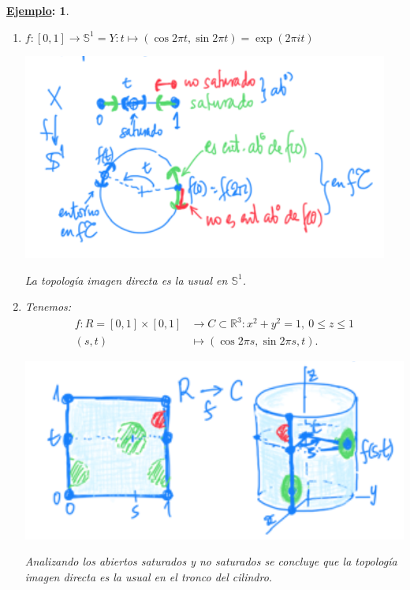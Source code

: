 \documentclass[10pt,a4paper,openright]{book}
\theoremstyle{break}
\newtheorem*{ej}{\underline{Ejemplo}:}
\begin{document}
\begin{ej}
\begin{enumerate}
    \item $f: \left[ 0, 1 \right] \rightarrow \mathbb{S}^1 = Y: t \mapsto \left( \cos 2\pi t, \sin 2\pi t \right) = \exp\left( 2 \pi i t \right)$
    \begin{center}
        \includegraphics[scale=0.4]{images/ej_sat_1} 

        \textit{La topología imagen directa es la usual en $\mathbb{S}^1$.} 
    \end{center}

    \item Tenemos:
    \begin{align*}
        f: R = \left[ 0, 1 \right] \times \left[ 0, 1 \right] &\rightarrow C \subset \mathbb{R}^3: x^2 + y^2 = 1,\ 0 \le z \le 1\\
        \left( s, t \right) &\mapsto \left( \cos 2\pi s, \sin 2\pi s, t \right) 
    .\end{align*}

    \begin{center}
        \includegraphics[scale=0.3]{images/ej_top_dir_2}

        \textit{Analizando los abiertos saturados y no saturados se concluye que la topología imagen directa es la usual en el tronco del cilindro.} 
    \end{center}
\end{enumerate}
\end{ej}
\end{document}
